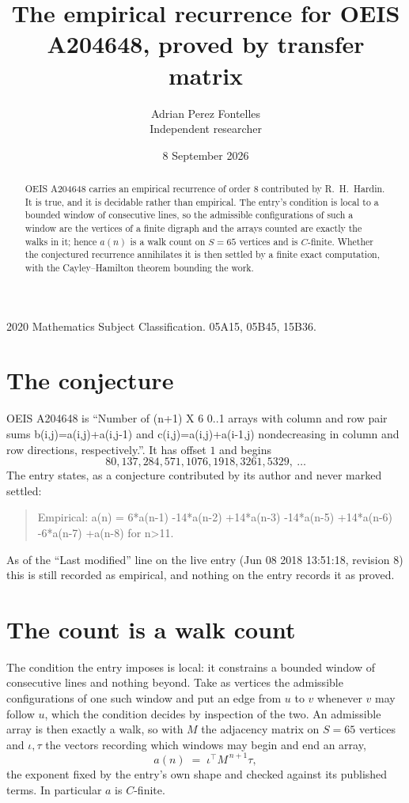 \documentclass[11pt,a4paper]{article}
\title{The empirical recurrence for OEIS A204648, proved by transfer matrix}
\author{Adrian Perez Fontelles\\ \small Independent researcher}
\date{8 September 2026}
\theoremstyle{plain}
\theoremstyle{definition}
\begin{document}
\maketitle

\begin{abstract}
OEIS A204648 carries an empirical recurrence of order $8$ contributed by R.~H.~Hardin. It is
true, and it is decidable rather than empirical. The entry's condition is local to a bounded window of consecutive lines, so
the admissible configurations of such a window are the vertices of a finite digraph and the
arrays counted are exactly the walks in it; hence $a(n)$ is a walk count on $S=65$ vertices
and is $C$-finite. Whether the conjectured recurrence annihilates it is then settled by a
finite exact computation, with the Cayley--Hamilton theorem bounding the work.
\end{abstract}

\noindent\small 2020 Mathematics Subject Classification. 05A15, 05B45, 15B36.\normalsize

\section{The conjecture}

OEIS A204648 is ``Number of (n+1) X 6 0..1 arrays with column and row pair sums b(i,j)=a(i,j)+a(i,j-1) and c(i,j)=a(i,j)+a(i-1,j) nondecreasing in column and row directions, respectively.''. It has offset $1$ and begins
\[
80, 137, 284, 571, 1076, 1918, 3261, 5329,\ \dots
\]
The entry states, as a conjecture contributed by its author and never marked settled:
\begin{quote}
Empirical: a(n) = 6*a(n-1) -14*a(n-2) +14*a(n-3) -14*a(n-5) +14*a(n-6) -6*a(n-7) +a(n-8) for n>11.
\end{quote}
As of the ``Last modified'' line on the live entry (Jun 08 2018 13:51:18, revision 8) this is still
recorded as empirical, and nothing on the entry records it as proved.

\section{The count is a walk count}

The condition the entry imposes is local: it constrains a bounded window of consecutive lines and nothing beyond. Take as
vertices the admissible configurations of one such window and put an edge from $u$ to $v$
whenever $v$ may follow $u$, which the condition decides by inspection of the two. An
admissible array is then exactly a walk, so with $M$ the adjacency matrix on $S=65$ vertices
and $\iota,\tau$ the vectors recording which windows may begin and end an array,
\[
a(n)\;=\;\iota^{\!\top}M^{\,n+1}\tau ,
\]
the exponent fixed by the entry's own shape and checked against its published terms. In
particular $a$ is $C$-finite.
\end{document}
